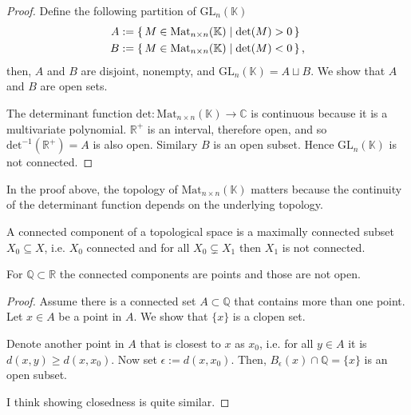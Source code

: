 %
\begin{proof}
    Define the following partition of \(\mathrm{GL}_n(\mathbb{K})\)
    \begin{align*}
        A &:= \left\{\, M \in \mathrm{Mat}_{n \times n}(\mathbb{K}) \mid \mathrm{det}(M) > 0 \,\right\} \\
        B &:= \left\{\, M \in \mathrm{Mat}_{n \times n}(\mathbb{K}) \mid \mathrm{det}(M) < 0 \,\right\} \text{,}
    \end{align*}
    then, \(A\) and \(B\) are disjoint, nonempty, and \(\mathrm{GL}_n(\mathbb{K}) = A \sqcup B\). We show that \(A\) and \(B\) are open sets.

    The determinant function \(\mathrm{det}: \mathrm{Mat}_{n \times n}(\mathbb{K}) \longrightarrow \mathbb{C}\) is continuous because it is a multivariate polynomial. \(\mathbb{R}^+\) is an interval, therefore open, and so \(\mathrm{det}^{-1}(\mathbb{R}^+) = A\) is also open. Similary \(B\) is an open subset. Hence \(\mathrm{GL}_n(\mathbb{K})\) is not connected.
\end{proof}
%
\begin{rembox}
    \begin{remark}
        In the proof above, the topology of \(\mathrm{Mat}_{n \times n}(\mathbb{K})\) matters because the continuity of the determinant function depends on the underlying topology.
    \end{remark}
\end{rembox}
%
\begin{defbox}
    \begin{definition}
        A connected component of a topological space is a maximally connected subset \(X_0 \subseteq X\), i.e. \(X_0\) connected and for all \(X_0 \subsetneq X_1\) then \(X_1\) is not connected.
    \end{definition}
\end{defbox}
%
\begin{example}
    For \(\mathbb{Q} \subset \mathbb{R}\) the connected components are points and those are not open.
\end{example}
%
\begin{proof}
    Assume there is a connected set \(A \subset \mathbb{Q}\) that contains more than one point. Let \(x \in A\) be a point in \(A\). We show that \(\{x\}\) is a clopen set.

    Denote another point in \(A\) that is closest to \(x\) as \(x_0\), i.e. for all \(y \in A\) it is \(d(x, y) \geq d(x, x_0)\). Now set \(\epsilon := d(x, x_0)\). Then, \(B_\epsilon(x) \cap \mathbb{Q} = \{x\}\) is an open subset.

    I think showing closedness is quite similar.
\end{proof}
